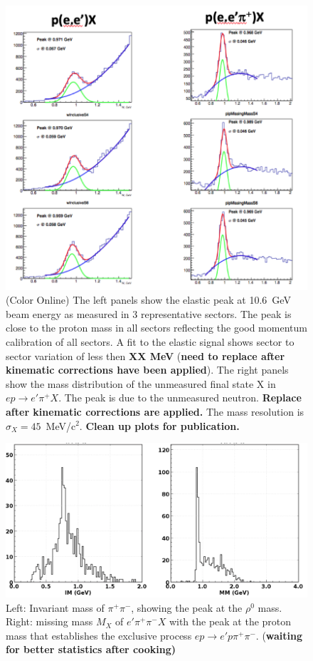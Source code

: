 \documentclass[final,3p,twocolumn]{elsarticle}
\begin{document}
\begin{figure}[htbp!]
\centerline{\includegraphics[width=1.0\columnwidth]{elastic_pi+n.png}}
\caption{(Color Online) The left panels show the elastic peak at 10.6~GeV beam energy as measured in 3 representative sectors. The
peak is close to the proton mass in all sectors reflecting the good momentum calibration of all sectors. A fit to the
elastic signal shows sector to sector variation of less then {\bf XX MeV} ({\bf need to replace after kinematic
corrections have been applied}). The right panels show the mass distribution of the unmeasured final state X in
$ep \to e'\pi^+ X$. The peak is due to the unmeasured neutron. {\bf Replace after kinematic corrections are applied.}
The mass resolution is $\sigma_X = 45$~MeV/c$^2$. {\bf Clean up plots for publication.}} 
\label{elastic-peak}
\end{figure} 

\begin{figure}[htbp!]
\centerline{\includegraphics[width=1.0\columnwidth]{pip-pim-p.png}}
\caption{Left: Invariant mass of $\pi^+\pi^-$, showing the peak at the $\rho^0$ mass. Right: missing mass 
$M_X$  of $e'\pi^+\pi^-X$ with the peak at the proton mass that establishes the exclusive process
$ep\to e' p \pi^+\pi^-$. ({\bf waiting for better statistics after cooking)}}
\label{pip-pim-p}
\end{figure} 
\end{document}
